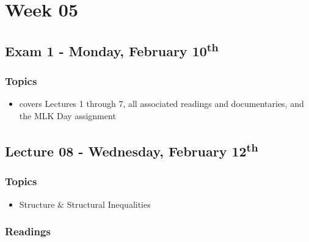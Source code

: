 \documentclass[]{book}
\providecommand{\tightlist}{%
  \setlength{\itemsep}{0pt}\setlength{\parskip}{0pt}}
\begin{document}
\newpage

\hypertarget{week-05}{%
\section*{Week 05}\label{week-05}}

\hypertarget{exam-1---monday-february-10th}{%
\subsection*{\texorpdfstring{Exam 1 - Monday, February 10\textsuperscript{th}}{Exam 1 - Monday, February 10th}}\label{exam-1---monday-february-10th}}

\hypertarget{topics-8}{%
\subsubsection*{Topics}\label{topics-8}}

\begin{itemize}
\tightlist
\item
  covers Lectures 1 through 7, all associated readings and documentaries, and the MLK Day assignment
\end{itemize}

\hypertarget{lecture-08---wednesday-february-12th}{%
\subsection*{\texorpdfstring{Lecture 08 - Wednesday, February 12\textsuperscript{th}}{Lecture 08 - Wednesday, February 12th}}\label{lecture-08---wednesday-february-12th}}

\hypertarget{topics-9}{%
\subsubsection*{Topics}\label{topics-9}}

\begin{itemize}
\tightlist
\item
  Structure \& Structural Inequalities
\end{itemize}

\hypertarget{readings-8}{%
\subsubsection*{Readings}\label{readings-8}}
\end{document}

